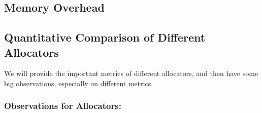\subsection{Memory Overhead}
\label{sec:memory}

\subsection{Quantitative Comparison of Different Allocators}

We will provide the important metrics of different allocators, and then have some big observations, especially on different metrics.


\subsubsection{Observations for Allocators:} 


